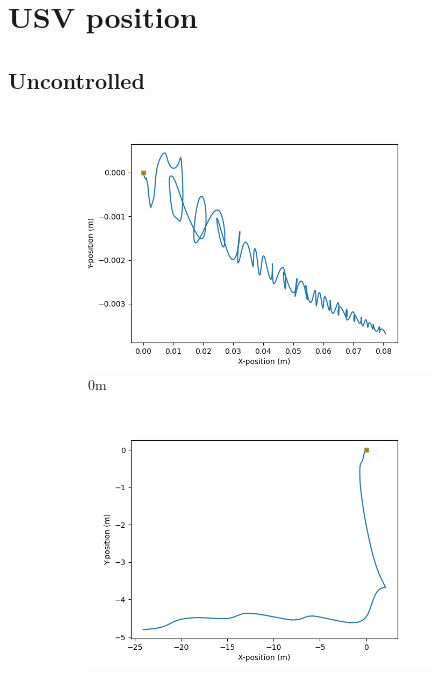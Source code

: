 \documentclass[class=article, crop=false]{standalone}
\begin{document}
\section{USV position}

\subsection{Uncontrolled}
\begin{figure}
    \centering
    \begin{subfigure}[b]{0.48\textwidth}
        \centering
        \includegraphics{scenario1/rov-0m/0.0m/usv_position_uncontrolled}
        \caption{0m}
        \label{}
    \end{subfigure}
    \hfill
    \begin{subfigure}[b]{0.48\textwidth}
        \centering
        \includegraphics{scenario1/rov-0m/0.5m/usv_position_uncontrolled}

\end{subfigure}
\end{figure}
\end{document}
